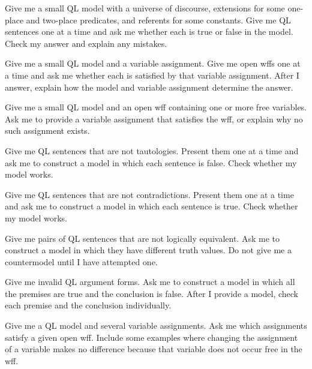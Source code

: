 \begin{genaipractice}[]

\item Give me a small QL model with a universe of discourse, extensions for some one-place and two-place predicates, and referents for some constants. Give me QL sentences one at a time and ask me whether each is true or false in the model. Check my answer and explain any mistakes.

\item Give me a small QL model and a variable assignment. Give me open wffs one at a time and ask me whether each is satisfied by that variable assignment. After I answer, explain how the model and variable assignment determine the answer.

\item Give me a small QL model and an open wff containing one or more free variables. Ask me to provide a variable assignment that satisfies the wff, or explain why no such assignment exists.

\item Give me QL sentences that are not tautologies. Present them one at a time and ask me to construct a model in which each sentence is false. Check whether my model works.

\item Give me QL sentences that are not contradictions. Present them one at a time and ask me to construct a model in which each sentence is true. Check whether my model works.

\item Give me pairs of QL sentences that are not logically equivalent. Ask me to construct a model in which they have different truth values. Do not give me a countermodel until I have attempted one.

\item Give me invalid QL argument forms. Ask me to construct a model in which all the premises are true and the conclusion is false. After I provide a model, check each premise and the conclusion individually.

\item Give me a QL model and several variable assignments. Ask me which assignments satisfy a given open wff. Include some examples where changing the assignment of a variable makes no difference because that variable does not occur free in the wff.

\end{genaipractice}